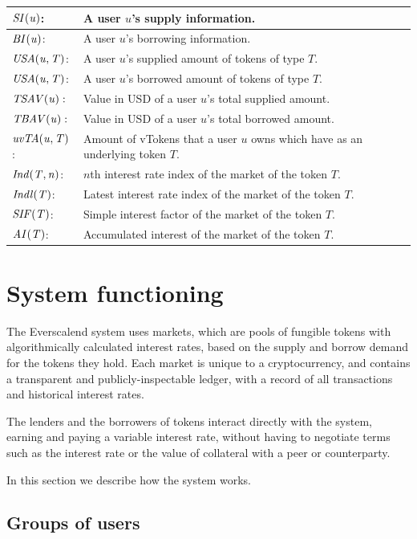 \begin{tabularx}{\linewidth}{|l X|}
  $\mathit{SI(u)}$: & A user $u$'s supply information. \\\hline
  $\mathit{BI(u)}$: & A user $u$'s borrowing information. \\\hline
  
  $\mathit{USA(u, T)}$: & A user $u$'s supplied amount of tokens of type $T$. \\\hline
  $\mathit{USA(u, T)}$: & A user $u$'s borrowed amount of tokens of type $T$. \\\hline
  
  $\mathit{TSAV(u)}:$ & Value in USD of a user $u$'s total supplied amount. \\\hline
  $\mathit{TBAV(u)}:$ & Value in USD of a user $u$'s total borrowed amount. \\\hline
  $\mathit{uvTA(u, T)}$: & Amount of vTokens that a user $u$ owns which have as an underlying token $T$. \\\hline


  $\mathit{Ind(T, n)}$: & $n$th interest rate index of the market of the token $T$. \\\hline
  $\mathit{Indl(T)}$: & Latest interest rate index of the market of the token $T$. \\\hline
  $\mathit{SIF(T)}$: & Simple interest factor of the market of the token $T$. \\\hline
  $\mathit{AI(T)}$: & Accumulated interest of the market of the token $T$. \\\hline

\end{tabularx}
\newpage
\section{System functioning}

The Everscalend system uses markets, which are pools of fungible tokens with algorithmically calculated interest rates, based on the supply and borrow demand for the tokens they hold. Each market is unique to a cryptocurrency, and contains a transparent and publicly-inspectable ledger, with a record of all transactions and historical interest rates.

The lenders and the borrowers of tokens interact directly with the system, earning and paying a variable interest rate, without having to negotiate terms such as the interest rate or the value of collateral with a peer or counterparty.

In this section we describe how the system works.

\subsection{Groups of users}

